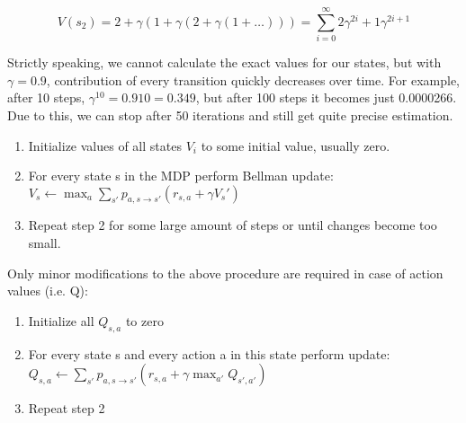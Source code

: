 \begin{equation*}
V(s_2) = 2 + \gamma (1 + \gamma(2 + \gamma(1 + \ldots))) = \sum_{i=0}^\infty 2\gamma^{2i}+1\gamma^{2i+1}
\end{equation*}

Strictly speaking, we cannot calculate the exact values for our states, but with
\begin{math}\gamma=0.9\end{math}, contribution of every transition quickly decreases over time. For
example, after 10 steps, \begin{math}\gamma^{10} = 0.910 = 0.349\end{math}, but after 100 steps it becomes just
0.0000266. Due to this, we can stop after 50 iterations and still get quite
precise estimation.



\begin{enumerate}
  \item Initialize values of all states \begin{math}V_i\end{math} to some
    initial value, usually zero.
  \item For every state s in the MDP perform Bellman update: \begin{math}V_s \leftarrow
    \max_a \sum_{s'}p_{a,s \rightarrow s'}(r_{s,a} + \gamma V_s')\end{math}
  \item Repeat step 2 for some large amount of steps or until changes become too small.
\end{enumerate}

Only minor modifications to the above procedure are required in case of action values (i.e. Q):


\begin{enumerate}
  \item Initialize all \begin{math}Q_{s,a}\end{math} to zero
  \item For every state s and every action a in this state perform
    update: \begin{math}Q_{s,a} \leftarrow \sum_{s'}p_{a,s \rightarrow
        s'}(r_{s,a} + \gamma \max_{a'}Q_{s',a'})\end{math}
  \item Repeat step 2
\end{enumerate}



